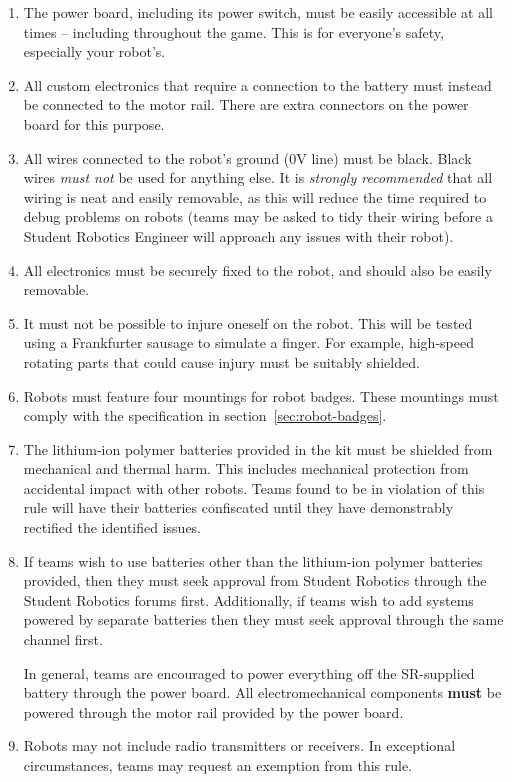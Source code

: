 \begin{enumerate}
\item The power board, including its power switch, must be easily accessible at all times -- including throughout the game.
      This is for everyone's safety, especially your robot's.

\item All custom electronics that require a connection to the battery must instead be connected to the motor rail.
      There are extra connectors on the power board for this purpose.

\item All wires connected to the robot's ground (0V line) must be black.
      Black wires \emph{must not} be used for anything else.
      It is \emph{strongly recommended} that all wiring is neat and easily removable, as this will reduce the time required to debug problems on robots
       (teams may be asked to tidy their wiring before a Student Robotics Engineer will approach any issues with their robot).

\item All electronics must be securely fixed to the robot, and should also be easily removable.

\item It must not be possible to injure oneself on the robot.
      This will be tested using a Frankfurter sausage to simulate a finger.
      For example, high-speed rotating parts that could cause injury must be suitably shielded.

\item Robots must feature four mountings for robot badges.
      These mountings must comply with the specification in section~\ref{sec:robot-badges}.

\item The lithium-ion polymer batteries provided in the kit must be shielded from mechanical and thermal harm.
      This includes mechanical protection from accidental impact with other robots.
      Teams found to be in violation of this rule will have their batteries confiscated until they have demonstrably rectified the identified issues.

\item If teams wish to use batteries other than the lithium-ion polymer batteries provided,
       then they must seek approval from Student Robotics through the Student Robotics forums first.
      Additionally, if teams wish to add systems powered by separate batteries then they must seek approval through the same channel first.

      In general, teams are encouraged to power everything off the SR-supplied battery through the power board.
      All electromechanical components \textbf{must} be powered through the motor rail provided by the power board.

\item Robots may not include radio transmitters or receivers.
      In exceptional circumstances, teams may request an exemption from this rule.

\end{enumerate}
